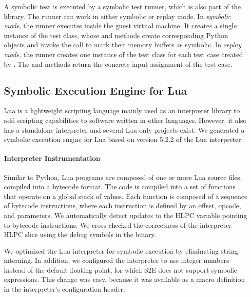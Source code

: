 A symbolic test is executed by a symbolic test runner, which is also part of the library.  The runner can work in either symbolic or replay mode. 
%
In \emph{symbolic mode}, the runner executes inside the guest virtual machine.  It creates a single instance of the test class, whose  and  methods create corresponding Python objects and invoke the  call to mark their memory buffers as symbolic.
%
In \emph{replay mode}, the runner creates one instance of the test class for each test case created by \chef. The  and  methods return the concrete input assignment of the test case.


\subsection{Symbolic Execution Engine for Lua}
\label{sec:eval:lua-proto}

Lua is a lightweight scripting language mainly used as an interpreter library to add scripting capabilities to software written in other languages. However, it also has a standalone interpreter and several Lua-only projects exist. We generated a symbolic execution engine for Lua based on version 5.2.2 of the Lua interpreter.

\paragraph{Interpreter Instrumentation}

Similar to Python, Lua programs are composed of one or more Lua source files, compiled into a bytecode format.  The code is compiled into a set of functions that operate on a global stack of values.  Each function is composed of a sequence of bytecode instructions, where each instruction is defined by an offset, opcode, and parameters.
%
We automatically detect updates to the HLPC variable pointing to bytecode instructions.  We cross-checked the correctness of the interpreter HLPC slice using the debug symbols in the binary.

We optimized the Lua interpreter for symbolic execution by eliminating string interning.  In addition, we configured the interpreter to use integer numbers instead of the default floating point, for which S2E does not support symbolic expressions.  This change was easy, because it was available as a macro definition in the interpreter's configuration header.


